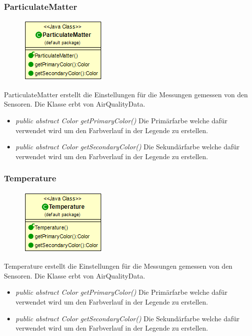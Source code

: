 \subsubsection{ParticulateMatter}
\begin{minipage}{0.3\textwidth}
    \begin{figure}[H]
        \includegraphics[scale = 0.5
        ]{media/view/airquality/ParticulateMatter_Class.png}
    \end{figure}
    \end{minipage} \hfill
    \begin{minipage}{0.6\textwidth}
ParticulateMatter erstellt die Einstellungen für die Messungen gemessen von den Sensoren. Die Klasse erbt von AirQualityData.
\end{minipage}
\begin{itemize} [noitemsep]
	\item \emph{public abstract Color getPrimaryColor()} Die Primärfarbe welche dafür verwendet wird um den Farbverlauf in der Legende zu erstellen.
	\item \emph{public abstract Color getSecondaryColor()} Die Sekundärfarbe welche dafür verwendet wird um den Farbverlauf in der Legende zu erstellen.
\end{itemize}

\subsubsection{Temperature}
\begin{minipage}{0.3\textwidth}
    \begin{figure}[H]
        \includegraphics[scale = 0.5
        ]{media/view/airquality/Temperature_Class.png}
    \end{figure}
    \end{minipage} \hfill
    \begin{minipage}{0.6\textwidth}
Temperature erstellt die Einstellungen für die Messungen gemessen von den Sensoren. Die Klasse erbt von AirQualityData.
\end{minipage}
\begin{itemize} [noitemsep]
	\item \emph{public abstract Color getPrimaryColor()} Die Primärfarbe welche dafür verwendet wird um den Farbverlauf in der Legende zu erstellen.
	\item \emph{public abstract Color getSecondaryColor()} Die Sekundärfarbe welche dafür verwendet wird um den Farbverlauf in der Legende zu erstellen.
\end{itemize}

